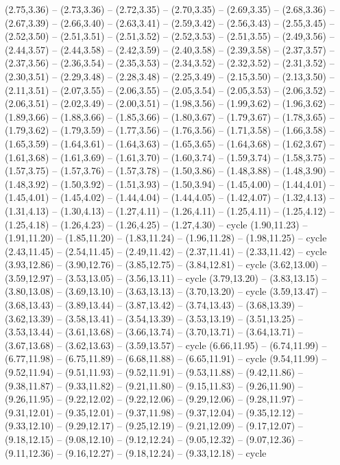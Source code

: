 {(2.75,3.36) -- (2.73,3.36) -- (2.72,3.35) -- (2.70,3.35) -- (2.69,3.35) -- (2.68,3.36) -- (2.67,3.39) -- (2.66,3.40) -- (2.63,3.41) -- (2.59,3.42) -- (2.56,3.43) -- (2.55,3.45) -- (2.52,3.50) -- (2.51,3.51) -- (2.51,3.52) -- (2.52,3.53) -- (2.51,3.55) -- (2.49,3.56) -- (2.44,3.57) -- (2.44,3.58) -- (2.42,3.59) -- (2.40,3.58) -- (2.39,3.58) -- (2.37,3.57) -- (2.37,3.56) -- (2.36,3.54) -- (2.35,3.53) -- (2.34,3.52) -- (2.32,3.52) -- (2.31,3.52) -- (2.30,3.51) -- (2.29,3.48) -- (2.28,3.48) -- (2.25,3.49) -- (2.15,3.50) -- (2.13,3.50) -- (2.11,3.51) -- (2.07,3.55) -- (2.06,3.55) -- (2.05,3.54) -- (2.05,3.53) -- (2.06,3.52) -- (2.06,3.51) -- (2.02,3.49) -- (2.00,3.51) -- (1.98,3.56) -- (1.99,3.62) -- (1.96,3.62) -- (1.89,3.66) -- (1.88,3.66) -- (1.85,3.66) -- (1.80,3.67) -- (1.79,3.67) -- (1.78,3.65) -- (1.79,3.62) -- (1.79,3.59) -- (1.77,3.56) -- (1.76,3.56) -- (1.71,3.58) -- (1.66,3.58) -- (1.65,3.59) -- (1.64,3.61) -- (1.64,3.63) -- (1.65,3.65) -- (1.64,3.68) -- (1.62,3.67) -- (1.61,3.68) -- (1.61,3.69) -- (1.61,3.70) -- (1.60,3.74) -- (1.59,3.74) -- (1.58,3.75) -- (1.57,3.75) -- (1.57,3.76) -- (1.57,3.78) -- (1.50,3.86) -- (1.48,3.88) -- (1.48,3.90) -- (1.48,3.92) -- (1.50,3.92) -- (1.51,3.93) -- (1.50,3.94) -- (1.45,4.00) -- (1.44,4.01) -- (1.45,4.01) -- (1.45,4.02) -- (1.44,4.04) -- (1.44,4.05) -- (1.42,4.07) -- (1.32,4.13) -- (1.31,4.13) -- (1.30,4.13) -- (1.27,4.11) -- (1.26,4.11) -- (1.25,4.11) -- (1.25,4.12) -- (1.25,4.18) -- (1.26,4.23) -- (1.26,4.25) -- (1.27,4.30) -- cycle
  (1.90,11.23) -- (1.91,11.20) -- (1.85,11.20) -- (1.83,11.24) -- (1.96,11.28) -- (1.98,11.25) -- cycle
  (2.43,11.45) -- (2.54,11.45) -- (2.49,11.42) -- (2.37,11.41) -- (2.33,11.42) -- cycle
  (3.93,12.86) -- (3.90,12.76) -- (3.85,12.75) -- (3.84,12.81) -- cycle
  (3.62,13.00) -- (3.59,12.97) -- (3.53,13.05) -- (3.56,13.11) -- cycle
  (3.79,13.20) -- (3.83,13.15) -- (3.80,13.08) -- (3.69,13.10) -- (3.63,13.13) -- (3.70,13.20) -- cycle
  (3.59,13.47) -- (3.68,13.43) -- (3.89,13.44) -- (3.87,13.42) -- (3.74,13.43) -- (3.68,13.39) -- (3.62,13.39) -- (3.58,13.41) -- (3.54,13.39) -- (3.53,13.19) -- (3.51,13.25) -- (3.53,13.44) -- (3.61,13.68) -- (3.66,13.74) -- (3.70,13.71) -- (3.64,13.71) -- (3.67,13.68) -- (3.62,13.63) -- (3.59,13.57) -- cycle
  (6.66,11.95) -- (6.74,11.99) -- (6.77,11.98) -- (6.75,11.89) -- (6.68,11.88) -- (6.65,11.91) -- cycle
  (9.54,11.99) -- (9.52,11.94) -- (9.51,11.93) -- (9.52,11.91) -- (9.53,11.88) -- (9.42,11.86) -- (9.38,11.87) -- (9.33,11.82) -- (9.21,11.80) -- (9.15,11.83) -- (9.26,11.90) -- (9.26,11.95) -- (9.22,12.02) -- (9.22,12.06) -- (9.29,12.06) -- (9.28,11.97) -- (9.31,12.01) -- (9.35,12.01) -- (9.37,11.98) -- (9.37,12.04) -- (9.35,12.12) -- (9.33,12.10) -- (9.29,12.17) -- (9.25,12.19) -- (9.21,12.09) -- (9.17,12.07) -- (9.18,12.15) -- (9.08,12.10) -- (9.12,12.24) -- (9.05,12.32) -- (9.07,12.36) -- (9.11,12.36) -- (9.16,12.27) -- (9.18,12.24) -- (9.33,12.18) -- cycle
}
